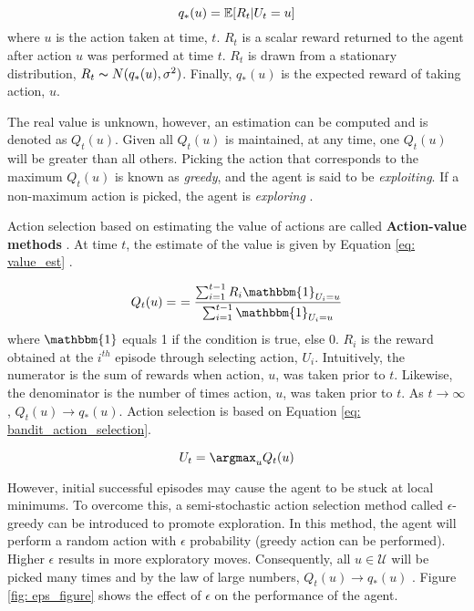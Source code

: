 \begin{equation}
    \centering
    q_*(u) = \mathbb{E}[R_t | U_t = u]
    \label{eq:01value}
\end{equation}
where $u$ is the action taken at time, $t$.  $R_t$ is a scalar reward returned to the agent after action $u$ was performed at time $t$. $R_t$ is drawn from a stationary distribution, $R_t \thicksim N(q_*(u), \sigma^2)$. Finally, $q_*(u)$ is the expected reward of taking action, $u$.

The real value is unknown, however, an estimation can be computed and is denoted as $Q_t(u)$.  Given all $Q_t(u)$ is maintained, at any time, one $Q_t(u)$ will be greater than all others. Picking the action that corresponds to the maximum $Q_t(u)$ is known as \textit{greedy}, and the agent is said to be \textit{exploiting}.  If a non-maximum action is picked, the agent is \textit{exploring} \cite{sutton}.

Action selection based on estimating the value of actions are called \textbf{Action-value methods} \cite{action_value_method}. At time $t$, the estimate of the value is given by Equation \ref{eq: value_est} \cite{sutton}.

\begin{equation}
    \centering
    Q_t(u) = \
    = \frac{\sum_{i=1}^{t - 1} R_i \mathbbm{1}_{U_i=u}}
    {\sum_{i = 1}^{t - 1} \mathbbm{1}_{U_i = u}}
    \label{eq: value_est}
\end{equation}
where $\mathbbm{1}$ equals 1 if the condition is true, else 0.  $R_i$ is the reward obtained at the $i^{th}$ episode through selecting action, $U_i$.  Intuitively, the numerator is the sum of rewards when action, $u$, was taken prior to $t$.  Likewise, the denominator is the number of times action, $u$, was taken prior to $t$. As $t \rightarrow \infty$, $Q_t(u) \rightarrow q_*(u)$.  Action selection is based on Equation \ref{eq: bandit_action_selection}.

\begin{equation}
    \centering
    U_t = \argmax_u Q_t(u)
    \label{eq: bandit_action_selection}
\end{equation}

However, initial successful episodes may cause the agent to be stuck at local minimums. To overcome this, a semi-stochastic action selection method called $\epsilon$-greedy can be introduced to promote exploration. In this method, the agent will perform a random action with $\epsilon$ probability (greedy action can be performed).  Higher $\epsilon$ results in more exploratory moves.  Consequently, all $u \in \mathcal{U}$ will be picked many times and by the law of large numbers, $Q_t(u) \rightarrow q_*(u)$ \cite{large_numbers}. Figure \ref{fig: eps_figure} shows the effect of $\epsilon$ on the performance of the agent.

